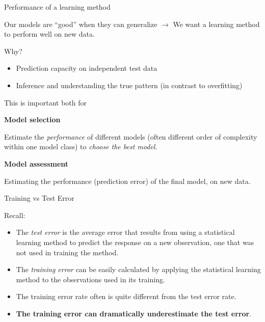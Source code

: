 \documentclass[10pt,ignorenonframetext,]{beamer}
\providecommand{\tightlist}{%
  \setlength{\itemsep}{0pt}\setlength{\parskip}{0pt}}
\begin{document}
\begin{frame}{Performance of a learning method}

Our models are ``good'' when they can generalize \(\rightarrow\) We want
a learning method to perform well on new data.

Why?

\begin{itemize}
\tightlist
\item
  Prediction capacity on independent test data
\item
  Inference and understanding the true pattern (in contrast to
  overfitting)
\end{itemize}

This is important both for

\textbf{Model selection}

Estimate the \emph{performance} of different models (often different
order of complexity within one model class) to \emph{choose the best
model}.

\textbf{Model assessment}

Estimating the performance (prediction error) of the final model, on new
data.

\end{frame}

\begin{frame}

\begin{block}{Training vs Test Error}

\vspace{2mm}

Recall:

\begin{itemize}
\item
  The \emph{test error} is the average error that results from using a
  statistical learning method to predict the response on a new
  observation, one that was not used in training the method.
\item
  The \emph{training error} can be easily calculated by applying the
  statistical learning method to the observations used in its training.
\item
  The training error rate often is quite different from the test error
  rate.
\item
  \textbf{The training error can dramatically underestimate the test
  error}.
\end{itemize}

\end{block}

\end{frame}
\end{document}
